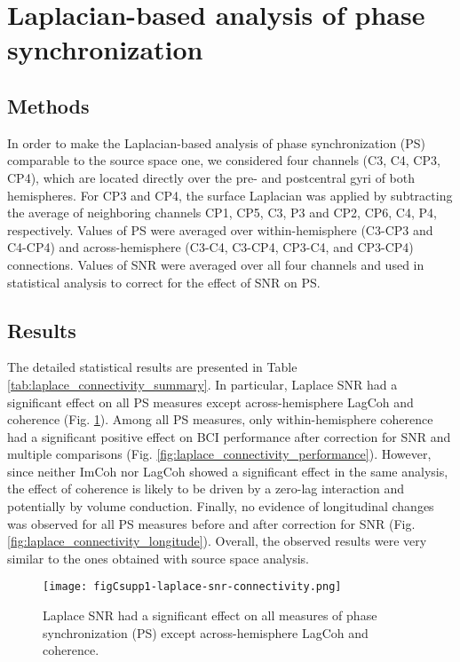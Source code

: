 \newpage

\section{Laplacian-based analysis of phase synchronization} \label{sec:laplace_connectivity}

\subsection{Methods}

In order to make the Laplacian-based analysis of phase synchronization (PS) comparable to the source space one, we considered four channels (C3, C4, CP3, CP4), which are located directly over the pre- and postcentral gyri of both hemispheres. For CP3 and CP4, the surface Laplacian was applied by subtracting the average of neighboring channels CP1, CP5, C3, P3 and CP2, CP6, C4, P4, respectively. Values of PS were averaged over within-hemisphere (C3-CP3 and C4-CP4) and across-hemisphere (C3-C4, C3-CP4, CP3-C4, and CP3-CP4) connections. Values of SNR were averaged over all four channels and used in statistical analysis to correct for the effect of SNR on PS.

\subsection{Results}

The detailed statistical results are presented in Table \ref{tab:laplace_connectivity_summary}. In particular, Laplace SNR had a significant effect on all PS measures except across-hemisphere LagCoh and coherence (Fig. \ref{fig:laplace_snr_connectivity}). Among all PS measures, only within-hemisphere coherence had a significant positive effect on BCI performance after correction for SNR and multiple comparisons (Fig. \ref{fig:laplace_connectivity_performance}). However, since neither ImCoh nor LagCoh showed a significant effect in the same analysis, the effect of coherence is likely to be driven by a zero-lag interaction and potentially by volume conduction. Finally, no evidence of longitudinal changes was observed for all PS measures before and after correction for SNR (Fig. \ref{fig:laplace_connectivity_longitude}). Overall, the observed results were very similar to the ones obtained with source space analysis.

\begin{figure}[htbp]
    \centering
    \texttt{[image: figCsupp1-laplace-snr-connectivity.png]}
    \caption{Laplace SNR had a significant effect on all measures of phase synchronization (PS) except across-hemisphere LagCoh and coherence.}
    \label{fig:laplace_snr_connectivity}
\end{figure}

